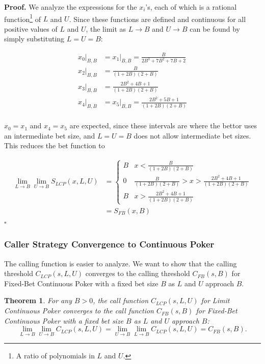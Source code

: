 \documentclass[a4paper,12pt]{article}
\theoremstyle{plain}
\newtheorem{theorem}{Theorem}[section]
\theoremstyle{definition}
\newenvironment{customproof}[1][Proof]{\noindent\textbf{#1.} }{\hfill$\square$\vspace{1em}}
\begin{document}
\begin{customproof}
We analyze the expressions for the $x_i$'s, each of which is a rational function\footnote{A ratio of polynomials in $L$ and $U$.} of $L$ and $U$. Since these functions are defined and continuous for all positive values of $L$ and $U$, the limit as $L \to B$ and $U \to B$ can be found by simply substituting $L = U = B$:

\begin{align*}
    x_0|_{B,B} & = x_1|_{B,B} = \frac{B}{2 B^3+7 B^2+7 B+2} \\
    x_2|_{B,B} & = \frac{B}{(1+2B)(2+B)} \\
    x_3|_{B,B} & = \frac{2 B^2+4 B+1}{(1+2B)(2+B)} \\
    x_4|_{B,B} & = x_5|_{B,B} = \frac{2 B^2+5 B+1}{(1+2B)(2+B)} \\
\end{align*}

$x_0 = x_1$ and $x_4 = x_5$ are expected, since these intervals are where the bettor uses an intermediate bet size, and $L=U=B$ does not allow intermediate bet sizes. This reduces the bet function to 

\begin{align*}
    \lim_{L \to B} \lim_{U \to B} S_{LCP}(x, L, U) & = \begin{cases}
    B & x < \frac{B}{(1+2B)(2+B)}\\
    0 & \frac{B}{(1+2B)(2+B)} > x > \frac{2 B^2+4 B+1}{(1+2B)(2+B)}\\
    B & x > \frac{2 B^2+4 B+1}{(1+2B)(2+B)}
    \end{cases}\\
    &= S_{FB}(x, B)
\end{align*}
\end{customproof}

\subsubsection{Caller Strategy Convergence to Continuous Poker}

The calling function is easier to analyze. We want to show that the calling threshold $C_{LCP}(s, L, U)$ converges to the calling threshold $C_{FB}(s, B)$ for Fixed-Bet Continuous Poker with a fixed bet size $B$ as $L$ and $U$ approach $B$.

\begin{theorem}
     For any $B > 0$, the call function $C_{LCP}(s, L, U)$ for Limit Continuous Poker converges to the call function $C_{FB}(s, B)$ for Fixed-Bet Continuous Poker with a fixed bet size $B$ as $L$ and $U$ approach $B$:
\[
\lim_{L \to B} \lim_{U \to B} C_{LCP}(s, L, U) = \lim_{U \to B} \lim_{L \to B} C_{LCP}(s, L, U) = C_{FB}(s, B).
\]
\end{theorem}
\end{document}
